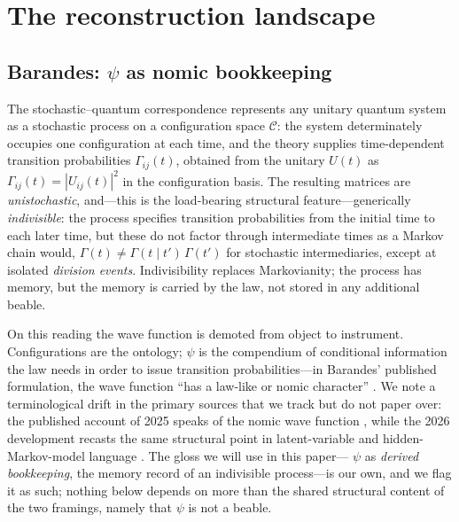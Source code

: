 \documentclass[11pt]{article}
\theoremstyle{remark}
\begin{document}
\section{The reconstruction landscape}
\label{sec:landscape}

\subsection{Barandes: $\psi$ as nomic bookkeeping}
\label{sec:barandes}

The stochastic--quantum correspondence
\cite{BarandesPoP,BarandesTheorem} represents any unitary quantum
system as a stochastic process on a configuration space $\mathcal{C}$:
the system determinately occupies one configuration at each time, and
the theory supplies time-dependent transition probabilities
$\Gamma_{ij}(t)$, obtained from the unitary $U(t)$ as
$\Gamma_{ij}(t)=|U_{ij}(t)|^{2}$ in the configuration basis. The
resulting matrices are \emph{unistochastic}, and---this is the
load-bearing structural feature---generically \emph{indivisible}: the
process specifies transition probabilities from the initial time to
each later time, but these do not factor through intermediate times as
a Markov chain would,
$\Gamma(t)\neq\Gamma(t\mid t')\,\Gamma(t')$ for stochastic
intermediaries, except at isolated \emph{division events}.
Indivisibility replaces Markovianity; the process has memory, but the
memory is carried by the law, not stored in any additional beable.

On this reading the wave function is demoted from object to
instrument. Configurations are the ontology; $\psi$ is the compendium
of conditional information the law needs in order to issue transition
probabilities---in Barandes' published formulation, the wave function
``has a law-like or nomic character'' \cite{BarandesPoP}. We note a
terminological drift in the primary sources that we track but do not
paper over: the published account of 2025 speaks of the nomic wave
function \cite{BarandesPoP}, while the 2026 development recasts the
same structural point in latent-variable and hidden-Markov-model
language \cite{BarandesHMM}. The gloss we will use in this paper---%
$\psi$ as \emph{derived bookkeeping}, the memory record of an
indivisible process---is our own, and we flag it as such; nothing
below depends on more than the shared structural content of the two
framings, namely that $\psi$ is not a beable.
\end{document}
